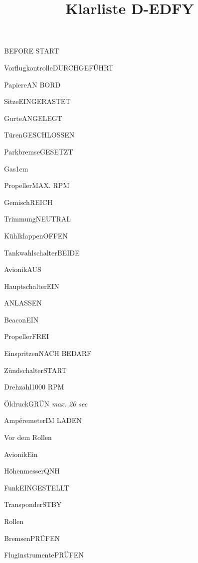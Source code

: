 \def\papersize{4}




\title{Klarliste D-EDFY}

  \begin{checklist}{BEFORE START}
    \item{Vorflugkontrolle}{DURCHGEFÜHRT}
    \item{Papiere}{AN BORD}
    \item{Sitze}{EINGERASTET}
    \item{Gurte}{ANGELEGT}
    \item{Türen}{GESCHLOSSEN}
    \item{Parkbremse}{GESETZT}
    \item{Gas}{1cm}
    \item{Propeller}{MAX. RPM}
    \item{Gemisch}{REICH}
    \item{Trimmung}{NEUTRAL}
    \item{Kühlklappen}{OFFEN}
    \item{Tankwahlschalter}{BEIDE}
    \item{Avionik}{AUS}
    \item{Hauptschalter}{EIN}
  \end{checklist}

  \begin{checklist}{ANLASSEN}
    \item{Beacon}{EIN}
    \item{Propeller}{FREI}
    \item{Einspritzen}{NACH BEDARF}
    \item{Zündschalter}{START}
    \item{Drehzahl}{1000 RPM}
    \item{Öldruck}{GRÜN \textit{max. 20 sec}}
    \item{Ampéremeter}{IM LADEN}
  \end{checklist}

  \begin{checklist}{Vor dem Rollen}
    \item{Avionik}{Ein}
    \item{Höhenmesser}{QNH}
    \item{Funk}{EINGESTELLT}
    \item{Transponder}{STBY}
  \end{checklist}

  \begin{checklist}{Rollen}
    \item{Bremsen}{PRÜFEN}
    \item{Fluginstrumente}{PRÜFEN}
  \end{checklist}

